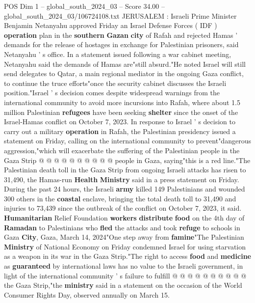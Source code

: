 \begin{textsample}{POS Dim 1 – global\_south\_2024\_03 – Score 34.00 – global\_south\_2024\_03/106724108.txt}  \label{ex:f1_pos_009}
JERUSALEM : Israeli Prime Minister Benjamin Netanyahu approved Friday an Israel Defense Forces ( IDF ) \textbf{operation} plan in the \textbf{southern} \textbf{Gazan} \textbf{city} of Rafah and rejected Hamas ' demands for the release of hostages in exchange for Palestinian prisoners, said Netanyahu ' s office.
In a statement issued following a war cabinet meeting, Netanyahu said the demands of Hamas are"still absurd."He noted Israel will still send delegates to Qatar, a main regional mediator in the ongoing Gaza conflict, to continue the truce efforts"once the security cabinet discusses the Israeli position."Israel ' s decision comes despite widespread warnings from the international community to avoid more incursions into Rafah, where about 1.5 million Palestinian \textbf{refugees} have been seeking \textbf{shelter} since the onset of the Israel-Hamas conflict on October 7, 2023.
In response to Israel ' s decision to carry out a military \textbf{operation} in Rafah, the Palestinian presidency issued a statement on Friday, calling on the international community to prevent"dangerous aggression,"which will exacerbate the suffering of the Palestinian people in the Gaza Strip @ @ @ @ @ @ @ @ @ @ people in Gaza, saying"this is a red line."The Palestinian death toll in the Gaza Strip from ongoing Israeli attacks has risen to 31,490, the Hamas-run \textbf{Health} \textbf{Ministry} said in a press statement on Friday.
During the past 24 hours, the Israeli \textbf{army} killed 149 Palestinians and wounded 300 others in the \textbf{coastal} enclave, bringing the total death toll to 31,490 and injuries to 73,439 since the outbreak of the conflict on October 7, 2023, it said. \textbf{Humanitarian} Relief Foundation \textbf{workers} \textbf{distribute} \textbf{food} on the 4th day of \textbf{Ramadan} to Palestinians who \textbf{fled} the attacks and took \textbf{refuge} to schools in Gaza \textbf{City}, Gaza, March 14, 2024"One step away from \textbf{famine}"The Palestinian \textbf{Ministry} of National Economy on Friday condemned Israel for using starvation as a weapon in its war in the Gaza Strip."The right to access \textbf{food} and \textbf{medicine} as \textbf{guaranteed} by international laws has no value to the Israeli government, in light of the international community ' s failure to fulfill @ @ @ @ @ @ @ @ @ @ the Gaza Strip,"the \textbf{ministry} said in a statement on the occasion of the World Consumer Rights Day, observed annually on March 15.

\end{textsample}

